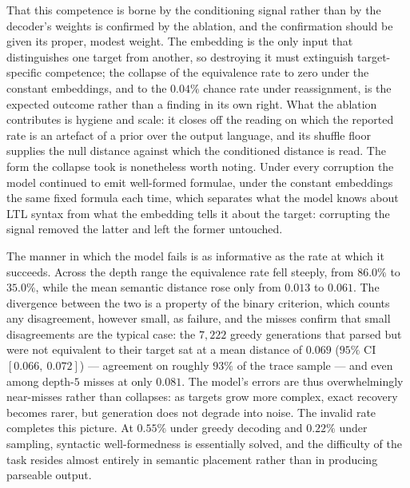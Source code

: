 \documentclass[titlepage,a4paper,11pt]{report}
\begin{document}
    That this competence is borne by the conditioning signal rather than by the decoder's weights is confirmed by the ablation, and the confirmation should be given its proper, modest weight. The embedding is the only input that distinguishes one target from another, so destroying it must extinguish target-specific competence; the collapse of the equivalence rate to zero under the constant embeddings, and to the $0.04\%$ chance rate under reassignment, is the expected outcome rather than a finding in its own right. What the ablation contributes is hygiene and scale: it closes off the reading on which the reported rate is an artefact of a prior over the output language, and its shuffle floor supplies the null distance against which the conditioned distance is read. The form the collapse took is nonetheless worth noting. Under every corruption the model continued to emit well-formed formulae, under the constant embeddings the same fixed formula each time, which separates what the model knows about LTL syntax from what the embedding tells it about the target: corrupting the signal removed the latter and left the former untouched.
    
    The manner in which the model fails is as informative as the rate at which it succeeds. Across the depth range the equivalence rate fell steeply, from $86.0\%$ to $35.0\%$, while the mean semantic distance rose only from $0.013$ to $0.061$. The divergence between the two is a property of the binary criterion, which counts any disagreement, however small, as failure, and the misses confirm that small disagreements are the typical case: the $7{,}222$ greedy generations that parsed but were not equivalent to their target sat at a mean distance of $0.069$ ($95\%$ CI $[0.066,\ 0.072]$) --- agreement on roughly $93\%$ of the trace sample --- and even among depth-$5$ misses at only $0.081$. The model's errors are thus overwhelmingly near-misses rather than collapses: as targets grow more complex, exact recovery becomes rarer, but generation does not degrade into noise. The invalid rate completes this picture. At $0.55\%$ under greedy decoding and $0.22\%$ under sampling, syntactic well-formedness is essentially solved, and the difficulty of the task resides almost entirely in semantic placement rather than in producing parseable output.
    
\end{document}
